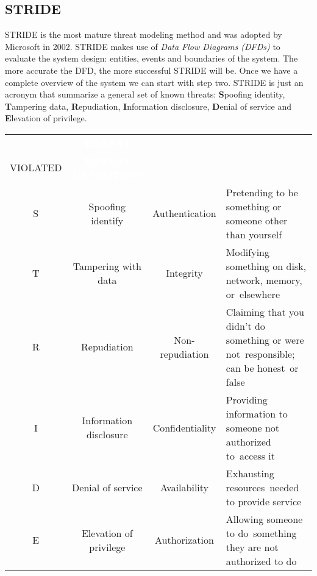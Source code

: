 \subsection{STRIDE}
STRIDE is the most mature threat modeling method and was adopted by Microsoft in 2002. STRIDE makes use of \textit{Data Flow Diagrams (DFDs)} to evaluate the system design: entities, events and boundaries of the system. The more accurate the DFD, the more successful STRIDE will be. Once we have a complete overview of the system we can start with step two. STRIDE is just an acronym that summarize a general set of known threats: \textbf{S}poofing identity, \textbf{T}ampering data, \textbf{R}epudiation, \textbf{I}nformation disclosure, \textbf{D}enial of service and \textbf{E}levation of privilege.

\begin{table}[H]
\centering
\begin{tabularx}{\textwidth}{|c|c|c|X|} 
\hline
{\cellcolor{white}}\textbf{\textcolor{white}{}} &
{\cellcolor{dummy-cyan}}\textbf{\textcolor{white}{THREAT}} & 
{\cellcolor{dummy-cyan}}\textbf{\textcolor{white}{\begin{tabular}[c]{@{}c@{}}PROPERTY\\VIOLATED\end{tabular} }} & \multicolumn{1}{|c|}{{\cellcolor{dummy-cyan}}\textbf{\textcolor{white}{THREAT DEFINITION}}}\\ 

\hline
{\cellcolor{dummy-yellow}}S & Spoofing identify & Authentication                                         & Pretending to be something or someone other than yourself                              \\ 
\hline
{\cellcolor{dummy-yellow}}T & Tampering with data & Integrity                                              & Modifying something on disk, network, memory, or~elsewhere                             \\ 
\hline
{\cellcolor{dummy-yellow}}R & Repudiation & Non-repudiation                                        & Claiming that you didn’t do something or were not~responsible; can be honest~or false  \\ 
\hline
{\cellcolor{dummy-yellow}}I & Information disclosure & Confidentiality & Providing information to someone not authorized to~access it                           \\ 
\hline
{\cellcolor{dummy-yellow}}D & Denial of service & Availability                                           & Exhausting resources~needed to provide service                                         \\ 
\hline
{\cellcolor{dummy-yellow}}E & Elevation of privilege & Authorization                                          & Allowing someone to do~something they are not authorized to do                         \\
\hline
\end{tabularx}
\end{table}\noindent
